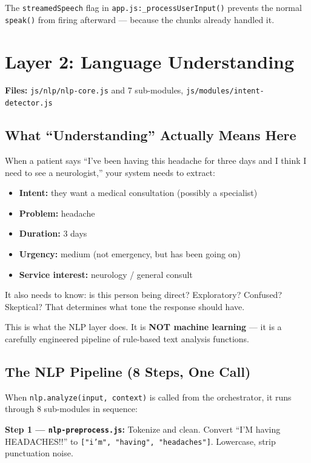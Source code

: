 \documentclass[12pt, a4paper]{report}
\newcommand{\ic}[1]{\texttt{\small\color{accentblue!70!black}#1}}
\begin{document}
The \ic{streamedSpeech} flag in \ic{app.js:\_processUserInput()} prevents the normal
\ic{speak()} from firing afterward --- because the chunks already handled it.

\chapter{Layer 2: Language Understanding}

\textbf{Files:} \ic{js/nlp/nlp-core.js} and 7 sub-modules, \ic{js/modules/intent-detector.js}

\section{What ``Understanding'' Actually Means Here}

When a patient says ``I've been having this headache for three days and I think I need to
see a neurologist,'' your system needs to extract:

\begin{itemize}
  \item \textbf{Intent:} they want a medical consultation (possibly a specialist)
  \item \textbf{Problem:} headache
  \item \textbf{Duration:} 3 days
  \item \textbf{Urgency:} medium (not emergency, but has been going on)
  \item \textbf{Service interest:} neurology / general consult
\end{itemize}

It also needs to know: is this person being direct? Exploratory? Confused? Skeptical?
That determines what tone the response should have.

This is what the NLP layer does. It is \textbf{NOT machine learning} --- it is a
carefully engineered pipeline of rule-based text analysis functions.

\section{The NLP Pipeline (8 Steps, One Call)}

When \ic{nlp.analyze(input, context)} is called from the orchestrator, it runs through
8 sub-modules in sequence:

\textbf{Step 1 --- \ic{nlp-preprocess.js}:} Tokenize and clean. Convert
``I'M having HEADACHES!!'' to \ic{["i'm", "having", "headaches"]}. Lowercase, strip
punctuation noise.
\end{document}

